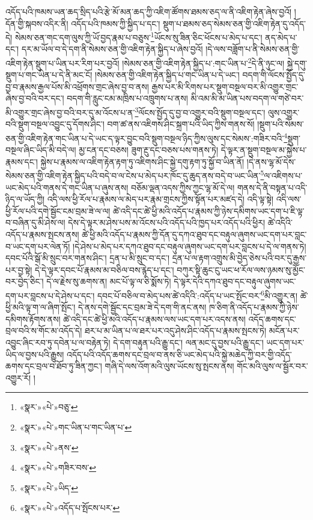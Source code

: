 འདོད་པའི་ཁམས་ཡན་ཆད་སྲིད་པའི་རྩེ་མོ་མན་ཆད་ཀྱི་འཇིག་ཚོགས་ཐམས་ཅད་ལ་ནི་འཇིག་རྟེན་ཞེས་བྱའོ། །དོན་གྱི་སྐབས་འདིར་ནི། འདོད་པའི་ཁམས་ཀྱི་སྐྱིད་པ་དང་། སྡུག་པ་ཐམས་ཅད་སེམས་ཅན་གྱི་འཇིག་རྟེན་དུ་འདོད་དེ། སེམས་ཅན་གང་དག་ལུས་ཀྱི་ཡོ་བྱད་རྣམ་པ་བཅུས་\footnote{«སྣར་»«པེ་»བཅུ་}ཡོངས་སུ་ཟིན་ཅིང་ཕོངས་པ་མེད་པ་དང་། ནད་མེད་པ་དང་། དར་མ་ཡོལ་བ་དེ་དག་ནི་སེམས་ཅན་གྱི་འཇིག་རྟེན་སྐྱིད་པ་ཞེས་བྱའོ། །དེ་ལས་བཟློག་པ་ནི་སེམས་ཅན་གྱི་འཇིག་རྟེན་སྡུག་པ་ཡིན་པར་རིག་པར་བྱའོ། །སེམས་ཅན་གྱི་འཇིག་རྟེན་སྐྱིད་པ་:གང་ཡིན་པ་\footnote{«སྣར་»«པེ་»གང་ཡིན་པ་གང་ཡིན་པ་}དེ་ནི་ཉུང་ལ། སྐྱེ་དགུ་སྡུག་པ་གང་ཡིན་པ་དེ་ནི་མང་ངོ། །སེམས་ཅན་གྱི་འཇིག་རྟེན་སྐྱིད་པ་གང་ཡིན་པ་དེ་ཡང་། བདག་གི་ལོངས་སྤྱོད་དུ་བྱ་བ་རྣམས་རྒྱལ་པོས་མི་འཕྲོགས་གྲང་ཞེས་བྱ་བ་ནས། རྒྱས་པར་མི་རིགས་པར་སྡུག་བསྔལ་བར་མི་འགྱུར་གྲང་ཞེས་བྱ་བའི་བར་དང་། བདག་གི་རླུང་ངམ་མཁྲིས་པ་འཁྲུགས་པ་ནས། མི་འམ་མི་མ་ཡིན་པས་བདག་ལ་གཙེ་བར་མི་འགྱུར་གྲང་ཞེས་བྱ་བའི་བར་དུ་མ་འོངས་པ་ན་\footnote{«སྣར་»«པེ་»ནས་}ལོངས་སྤྱོད་དུ་བྱ་བ་འགྱུར་བའི་སྡུག་བསྔལ་དང་། ལུས་འགྱུར་བའི་སྡུག་བསྔལ་འབྱུང་དུ་དོགས་ཤིང་། བག་ཚ་ནས་འཇིགས་ཤིང་སྐྲག་པའི་ཡིད་ཀྱིས་གནས་སོ། །སྡུག་པའི་སེམས་ཅན་གྱི་འཇིག་རྟེན་གང་ཡིན་པ་དེ་ཡང་ད་ལྟར་བྱུང་བའི་སྡུག་བསྔལ་ཉིད་ཀྱིས་ལུས་དང་སེམས་:གཟིར་བའི་\footnote{«སྣར་»«པེ་»གཟིར་བས་}སྡུག་བསྔལ་ཞིང་ཡིད་མི་བདེ་ལ། མྱ་ངན་དང་བཅས། ཟུག་རྔུ་དང་བཅས་པས་གནས་ཏེ། དེ་ལྟར་ན་སྡུག་བསྔལ་མ་སྐྱེས་པ་རྣམས་དང་། སྐྱེས་པ་རྣམས་ལ་འཇིག་རྟེན་རྟག་ཏུ་འཇིགས་ཤིང་སྐྱེ་དགུ་རྟག་ཏུ་སྐྱོ་བ་ཡིན་ནོ། །དེ་ནས་ལྷ་མོ་དེས་སེམས་ཅན་གྱི་འཇིག་རྟེན་སྐྱིད་པའི་བདེ་བ་ལ་ངེས་པ་མེད་པར་ཁོང་དུ་ཆུད་ནས་བདེ་བ་ཡང་ཡིན་\footnote{«སྣར་»«པེ་»ཡིད་}ལ་འཇིགས་པ་ཡང་མེད་པའི་གནས་དེ་གང་ཡིན་པ་ཞུས་ནས། བཅོམ་ལྡན་འདས་ཀྱིས་ཀྱང་ལྷ་མོ་དེ་ལ། གནས་དེ་ནི་བསྟན་པ་འདི་ཉིད་ལ་ཡོད་ཀྱི། འདི་ལས་ཕྱི་རོལ་པ་རྣམས་ལ་མེད་པར་རྣམ་གྲངས་ཀྱིས་སྟོན་པར་མཛད་དེ། འདི་ལྟ་སྟེ། འདི་ལས་ཕྱི་རོལ་པའི་དགེ་སྦྱོང་ངམ་བྲམ་ཟེ་ལ་ལ། ཚེ་འདི་དང་ཚེ་ཕྱི་མའི་འདོད་པ་རྣམས་ཀྱི་ཉེས་དམིགས་ཡང་དག་པ་ཇི་ལྟ་བ་བཞིན་དུ་མི་ཤེས་ལ། དེས་དེ་ལྟར་མ་ཤེས་པས་མ་འོངས་པའི་འདོད་པའི་ཁྱད་པར་འདོད་པའི་ཕྱིར། ཚེ་འདིའི་འདོད་པ་རྣམས་སྤངས་ནས། ཚེ་ཕྱི་མའི་འདོད་པ་རྣམས་ཀྱི་དོན་དུ་དཀའ་ཐུབ་དང་བརྟུལ་ཞུགས་ཡང་དག་པར་བླང་བ་ཡང་དག་པར་ལེན་ཏོ། །དེ་ཤེས་པ་མེད་པར་དཀའ་ཐུབ་དང་བརྟུལ་ཞུགས་ཡང་དག་པར་བླངས་པ་དེ་ལ་གནས་ཏེ། དབང་པོའི་སྒོ་མི་སྲུང་བར་གནས་ཤིང་། དྲན་པ་མི་སྲུང་བ་དང་། དྲན་པ་ལ་རྟག་འགྲུས་མི་བྱེད་ཅེས་པའི་བར་དུ་རྒྱས་པར་བྱ་སྟེ། དེ་དེ་ལྟར་དབང་པོ་རྣམས་མ་བཅིལ་བས་རྙེད་པ་དང་། བཀུར་སྟི་ཆུང་ངུ་ཡང་ཕ་རོལ་ལས་ཉམས་སུ་མྱོང་བར་བྱེད་ཅིང་། དེ་ལ་རྗེས་སུ་ཆགས་ན། མང་པོ་ལྟ་ལ་ཅི་སྨོས་ཏེ། དེ་ལྟར་དེའི་དཀའ་ཐུབ་དང་བརྟུལ་ཞུགས་ཡང་དག་པར་བླངས་པ་དེ་ཤེས་པ་དང་། དབང་པོ་བཅིལ་བ་མེད་པས་ཚེ་འདིའི་:འདོད་པ་ཡང་སྤོང་བར་\footnote{«སྣར་»«པེ་»འདོད་པ་སྤོངས་པར་}མི་འགྱུར་ན། ཚེ་ཕྱི་མའི་ལྟ་ག་ལ་ཞིག་སྤོང་། དེ་ནས་དགེ་སྦྱོང་དང་བྲམ་ཟེ་དེ་དག་གི་ནང་ནས། ཁ་ཅིག་ནི་འདོད་པ་རྣམས་ཀྱི་ཉེས་དམིགས་རྟོགས་ནས། ཚེ་འདི་དང་ཚེ་ཕྱི་མའི་འདོད་པ་རྣམས་ལས་ཡང་དག་པར་འདས་ནས། འདོད་ཆགས་དང་བྲལ་བའི་ས་གོང་མ་འདོད་དེ། ཐར་པ་མ་ཡིན་པ་ལ་ཐར་པར་འདུ་ཤེས་ཤིང་འདོད་པ་རྣམས་སྤངས་ཏེ། མངོན་པར་འབྱུང་ཞིང་རབ་ཏུ་དབེན་པ་ལ་བརྟེན་ཏེ། དེ་དག་བརྟུན་པའི་རྒྱུ་དང་། ལན་མང་དུ་བྱས་པའི་རྒྱུ་དང་། ཡང་དག་པར་ཡིད་ལ་བྱས་པའི་རྒྱུས། འདོད་པའི་འདོད་ཆགས་དང་བྲལ་བ་ནས་ཅི་ཡང་མེད་པའི་སྐྱེ་མཆེད་ཀྱི་བར་གྱི་འདོད་ཆགས་དང་བྲལ་བ་ཐོབ་ཏུ་ཟིན་ཀྱང་། གཞི་དེ་ལས་འོག་མའི་ལུས་ཡོངས་སུ་སྤངས་ནས། གོང་མའི་ལུས་ལ་སྦྱོར་བར་འགྱུར་རོ། །
